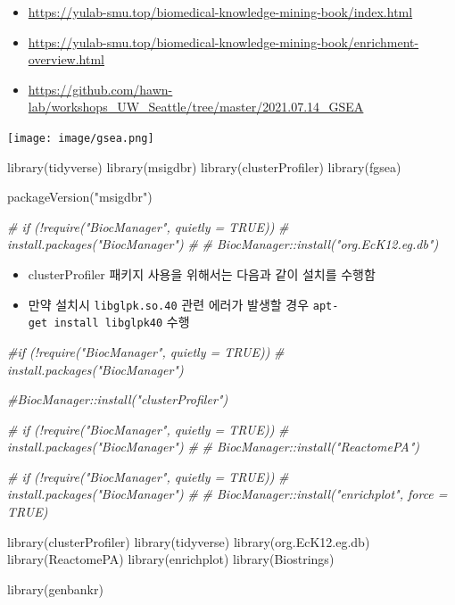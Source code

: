 \documentclass[
]{book}
\newenvironment{Shaded}{\begin{snugshade}}{\end{snugshade}}
\newcommand{\CommentTok}[1]{\textcolor[rgb]{0.56,0.35,0.01}{\textit{#1}}}
\newcommand{\FunctionTok}[1]{\textcolor[rgb]{0.00,0.00,0.00}{#1}}
\newcommand{\NormalTok}[1]{#1}
\newcommand{\StringTok}[1]{\textcolor[rgb]{0.31,0.60,0.02}{#1}}
\providecommand{\tightlist}{%
  \setlength{\itemsep}{0pt}\setlength{\parskip}{0pt}}
\begin{document}
\begin{itemize}
\tightlist
\item
  \url{https://yulab-smu.top/biomedical-knowledge-mining-book/index.html}
\item
  \url{https://yulab-smu.top/biomedical-knowledge-mining-book/enrichment-overview.html}
\item
  \url{https://github.com/hawn-lab/workshops_UW_Seattle/tree/master/2021.07.14_GSEA}
\end{itemize}

\texttt{[image: image/gsea.png]}

\begin{Shaded}
\begin{Highlighting}[]
\FunctionTok{library}\NormalTok{(tidyverse)}
\FunctionTok{library}\NormalTok{(msigdbr)}
\FunctionTok{library}\NormalTok{(clusterProfiler)}
\FunctionTok{library}\NormalTok{(fgsea)}

\FunctionTok{packageVersion}\NormalTok{(}\StringTok{"msigdbr"}\NormalTok{)}


\CommentTok{\# if (!require("BiocManager", quietly = TRUE))}
\CommentTok{\#     install.packages("BiocManager")}
\CommentTok{\# }
\CommentTok{\# BiocManager::install("org.EcK12.eg.db")}
\end{Highlighting}
\end{Shaded}

\begin{itemize}
\tightlist
\item
  clusterProfiler 패키지 사용을 위해서는 다음과 같이 설치를 수행함
\item
  만약 설치시 \texttt{libglpk.so.40} 관련 에러가 발생할 경우 \texttt{apt-get\ install\ libglpk40} 수행
\end{itemize}

\begin{Shaded}
\begin{Highlighting}[]
\CommentTok{\#if (!require("BiocManager", quietly = TRUE))}
\CommentTok{\#    install.packages("BiocManager")}

\CommentTok{\#BiocManager::install("clusterProfiler")}

\CommentTok{\# if (!require("BiocManager", quietly = TRUE))}
\CommentTok{\#     install.packages("BiocManager")}
\CommentTok{\# }
\CommentTok{\# BiocManager::install("ReactomePA")}

\CommentTok{\# if (!require("BiocManager", quietly = TRUE))}
\CommentTok{\#     install.packages("BiocManager")}
\CommentTok{\# }
\CommentTok{\# BiocManager::install("enrichplot", force = TRUE)}


\FunctionTok{library}\NormalTok{(clusterProfiler)}
\FunctionTok{library}\NormalTok{(tidyverse)}
\FunctionTok{library}\NormalTok{(org.EcK12.eg.db)}
\FunctionTok{library}\NormalTok{(ReactomePA)}
\FunctionTok{library}\NormalTok{(enrichplot)}
\FunctionTok{library}\NormalTok{(Biostrings)}

\FunctionTok{library}\NormalTok{(genbankr)}
\end{Highlighting}
\end{Shaded}
\end{document}
